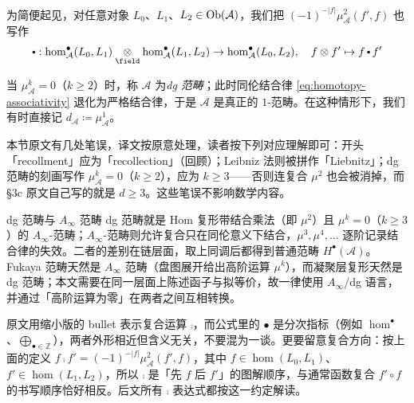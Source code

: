 \begin{dfn}
\begin{itemize}
\begin{equation}
\end{equation}
为简便起见，对任意对象 $L_0$、$L_1$、$L_2\in\operatorname{Ob}(\mathcal{A})$，我们把 $(-1)^{-\vert f\vert}\mu_{\mathcal{A}}^2 (f',f)$ 也写作
$$
\comp
:
\hom_{\mathcal{A}}^{\bullet}(L_0,L_1)\underset{\field}{\otimes}\hom_{\mathcal{A}}^{\bullet}(L_1,L_2)
\rightarrow
\hom_{\mathcal{A}}^{\bullet}(L_0,L_2),
\quad
f\otimes f'
\mapsto
f\comp f'
$$
\end{itemize}
当 $\mu_{\mathcal{A}}^k=0$（$k\geq 2$）时，称 $\mathcal{A}$ 为\emph{dg 范畴}；此时同伦结合律 \eqref{eq:homotopy-associativity} 退化为严格结合律，于是 $\mathcal{A}$ 是真正的 $1$-范畴。在这种情形下，我们有时直接记 $d_{\mathcal{A}}\coloneqq\mu_{\mathcal{A}}^1$。
\end{dfn}

\begin{yizhu}[原文拼写与笔误]
本节原文有几处笔误，译文按原意处理，读者按下列对应理解即可：开头「recollment」应为「recollection」（回顾）；Leibniz 法则被拼作「Liebnitz」；dg 范畴的刻画写作 $\mu_{\mathcal{A}}^k=0$（$k\geq 2$），应为 $k\geq 3$——否则连复合 $\mu^2$ 也会被消掉，而 §3c 原文自己写的就是 $d\geq 3$。这些笔误不影响数学内容。
\end{yizhu}

\begin{conceptbox}{dg 范畴与 $A_{\infty}$ 范畴}
dg 范畴就是 Hom 复形带结合乘法（即 $\mu^2$）且 $\mu^k=0$（$k\geq 3$）的 $A_{\infty}$-范畴；$A_{\infty}$-范畴则允许复合只在同伦意义下结合，$\mu^3,\mu^4,\dots$ 逐阶记录结合律的失效。二者的差别在链层面，取上同调后都得到普通范畴 $H^{\bullet}(\mathcal{A})$。Fukaya 范畴天然是 $A_{\infty}$ 范畴（盘图展开给出高阶运算 $\mu^k$），而凝聚层复形天然是 dg 范畴；本文需要在同一层面上陈述函子与拟等价，故一律使用 $A_{\infty}$/dg 语言，并通过「高阶运算为零」在两者之间互相转换。
\par\smallskip{}
\end{conceptbox}

\begin{yizhu}
原文用缩小版的 bullet 表示复合运算 $\comp$，而公式里的 $\bullet$ 是分次指标（例如 $\hom^{\bullet}$、$\bigoplus_{\bullet\in\mathbb{Z}}$），两者外形相近但含义无关，不要混为一谈。更要留意复合方向：按上面的定义 $f\comp f'=(-1)^{-\vert f\vert}\mu_{\mathcal{A}}^2 (f',f)$，其中 $f\in\hom(L_0,L_1)$、$f'\in\hom(L_1,L_2)$，所以 $\comp$ 是「先 $f$ 后 $f'$」的图解顺序，与通常函数复合 $f'\circ f$ 的书写顺序恰好相反。后文所有 $\comp$ 表达式都按这一约定解读。
\end{yizhu}

